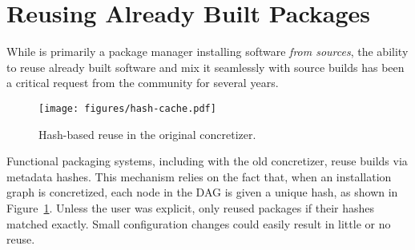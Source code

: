 \section{Reusing Already Built Packages}
\label{sec:reuse}

While \spack{} is primarily a package manager installing software \emph{from sources},
the ability to reuse already built software and mix it seamlessly with source builds has
been a critical request from the community for several years.

\begin{figure}[t]
  \centering
  \texttt{[image: figures/hash-cache.pdf]}
  \caption{
    Hash-based reuse in the original \spack concretizer.
    \label{fig:hash_reuse}
  }
\end{figure}

Functional packaging systems, including \spack{} with the old concretizer, reuse builds
via metadata hashes. This mechanism relies on the fact that, when an installation graph
is concretized, each node in the DAG is given a unique hash, as shown in
Figure~\ref{fig:hash_reuse}.
Unless the user was explicit, \spack{} only reused packages if their hashes matched
exactly. Small configuration changes could easily result in little or no reuse.



